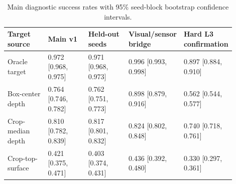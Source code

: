 \begin{table}[t]
\centering
\caption{Main diagnostic success rates with 95\% seed-block bootstrap confidence intervals.}
\label{tab:main-results-with-ci}
\scriptsize
\setlength{\tabcolsep}{3pt}
\begin{tabular}{p{0.18\linewidth}p{0.18\linewidth}p{0.18\linewidth}p{0.18\linewidth}p{0.18\linewidth}}
\toprule
Target source & Main v1 & Held-out seeds & Visual/sensor bridge & Hard L3 confirmation \\
\midrule
Oracle target & 0.972 [0.968, 0.975] & 0.971 [0.968, 0.973] & 0.996 [0.993, 0.998] & 0.897 [0.884, 0.910] \\
Box-center depth & 0.764 [0.746, 0.782] & 0.762 [0.751, 0.773] & 0.898 [0.879, 0.916] & 0.562 [0.544, 0.577] \\
Crop-median depth & 0.810 [0.782, 0.839] & 0.817 [0.801, 0.832] & 0.824 [0.802, 0.848] & 0.740 [0.718, 0.761] \\
Crop-top-surface & 0.421 [0.375, 0.471] & 0.403 [0.374, 0.431] & 0.436 [0.392, 0.480] & 0.330 [0.297, 0.361] \\
\bottomrule
\end{tabular}
\end{table}
